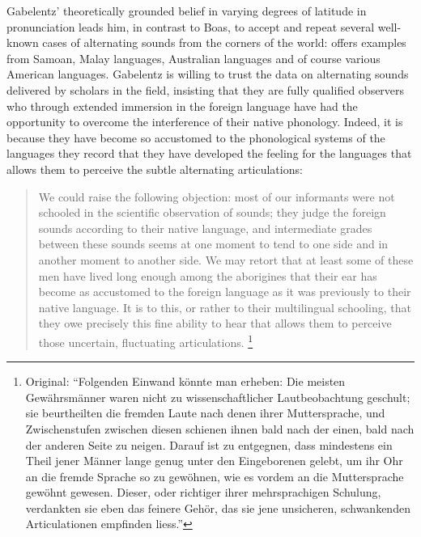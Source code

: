 \documentclass[output=paper]{langscibook}
\begin{document}
Gabelentz' theoretically grounded belief in varying degrees of latitude in pronunciation leads him, in contrast to Boas, to accept and repeat several well-known cases of alternating sounds from the corners of the world: \citet[202--204]{Gabelentz20161891} offers examples from Samoan, Malay languages, Australian languages and of course various American languages. Gabelentz is willing to trust the data on alternating sounds delivered by scholars in the field, insisting that they are fully qualified observers who through extended immersion in the foreign language have had the opportunity to overcome the interference of their native phonology. Indeed, it is because they have become so accustomed to the phonological systems of the languages they record that they have developed the feeling for the languages that allows them to perceive the subtle alternating articulations:

\begin{quotation}
We could raise the following objection: most of our informants were not schooled in the scientific observation of sounds; they judge the foreign sounds according to their native language, and intermediate grades between these sounds seems at one moment to tend to one side and in another moment to another side. We may retort that at least some of these men have lived long enough among the aborigines that their ear has become as accustomed to the foreign language as it was previously to their native language. It is to this, or rather to their multilingual schooling, that they owe precisely this fine ability to hear that allows them to perceive those uncertain, fluctuating articulations. \citep[204--205]{Gabelentz20161891}\footnote{Original: ``Folgenden Einwand könnte man erheben: Die meisten Gewährsmänner waren nicht zu wissenschaftlicher Lautbeobachtung geschult; sie beurtheilten die fremden Laute nach denen ihrer Muttersprache, und Zwischenstufen zwischen diesen schienen ihnen bald nach der einen, bald nach der anderen Seite zu neigen. Darauf ist zu entgegnen, dass mindestens ein Theil jener Männer lange genug unter den Eingeborenen gelebt, um ihr Ohr an die fremde Sprache so zu gewöhnen, wie es vordem an die Muttersprache gewöhnt gewesen. Dieser, oder richtiger ihrer mehrsprachigen Schulung, verdankten sie eben das feinere Gehör, das sie jene unsicheren, schwankenden Articulationen empfinden liess.''}
\end{quotation}
\end{document}
